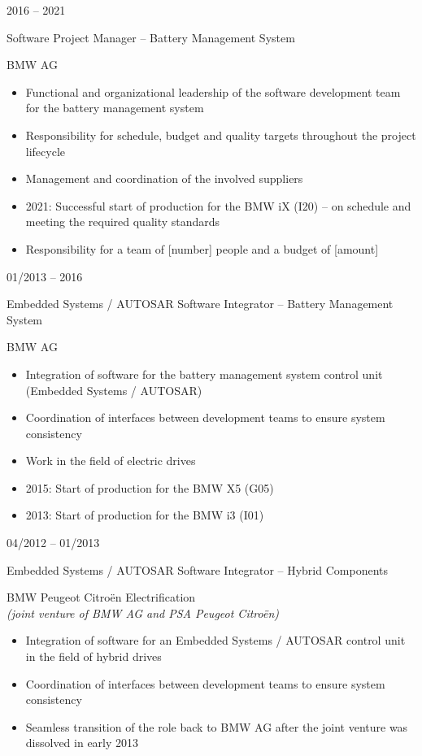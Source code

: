 \documentclass[a4paper,10pt]{article}
\newlength{\cvcolumngapwidth}
\newlength{\cvleftcolumnwidth}
\newlength{\cvrightcolumnwidth}
\newcommand{\cvtitlestyle}[1]{{\large\cvtitlefont\textcolor{cvtitlecolor}{#1}}}
\newcommand{\cvdurationstyle}[1]{{\small\cvdurationfont\textcolor{cvdurationcolor}{#1}}}
\newlength{\cvafteritemskipamount}
\newlength{\cvaftertitleskipamount}
\newlength{\cvparskip}
\newcommand{\cvitem}[2]{
    \begin{minipage}[t]{\cvleftcolumnwidth}
        \raggedleft #1
    \end{minipage}%
    \hspace{\cvcolumngapwidth}%
    \begin{minipage}[t]{\cvrightcolumnwidth}
        \setlength{\parskip}{\cvparskip} #2
    \end{minipage}
    \vspace{\cvafteritemskipamount}
}
\newcommand{\cvtitle}[1]{
    \cvtitlestyle{#1}
    \vspace{\cvaftertitleskipamount}
    \vspace{-\cvparskip}
}
\begin{document}
\cvitem{
    \cvdurationstyle{2016 -- 2021}
}{
    \cvtitle{Software Project Manager -- Battery Management System}

    BMW AG

    \begin{itemize}[leftmargin=*]
        \item Functional and organizational leadership of the software development team for the battery management system
        \item Responsibility for schedule, budget and quality targets throughout the project lifecycle
        \item Management and coordination of the involved suppliers
        \item 2021: Successful start of production for the BMW iX (I20) -- on schedule and meeting the required quality standards
        \item %
              Responsibility for a team of [number] people and a budget of [amount]
    \end{itemize}
}

\cvitem{
    \cvdurationstyle{01/2013 -- 2016}
}{
    \cvtitle{Embedded Systems / AUTOSAR Software Integrator -- Battery Management System}

    BMW AG

    \begin{itemize}[leftmargin=*]
        \item Integration of software for the battery management system control unit (Embedded Systems / AUTOSAR)
        \item Coordination of interfaces between development teams to ensure system consistency
        \item Work in the field of electric drives
        \item 2015: Start of production for the BMW X5 (G05)
        \item 2013: Start of production for the BMW i3 (I01)
    \end{itemize}
}

\cvitem{
    \cvdurationstyle{04/2012 -- 01/2013}
}{
    \cvtitle{Embedded Systems / AUTOSAR Software Integrator -- Hybrid Components}

    BMW Peugeot Citroën Electrification\\
    \textit{(joint venture of BMW AG and PSA Peugeot Citroën)}

    \begin{itemize}[leftmargin=*]
        \item Integration of software for an Embedded Systems / AUTOSAR control unit in the field of hybrid drives
        \item Coordination of interfaces between development teams to ensure system consistency
        \item Seamless transition of the role back to BMW AG after the joint venture was dissolved in early 2013
    \end{itemize}
}
\end{document}
